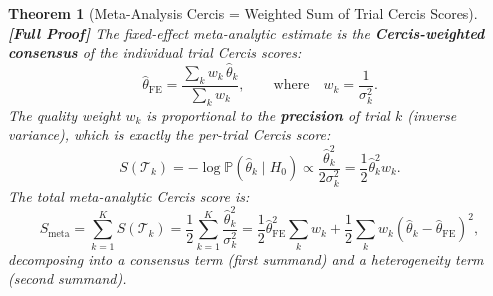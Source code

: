 \documentclass[12pt,a4paper]{article}
\newtheorem{theorem}{Theorem}[section]
\theoremstyle{remark}
\newcommand{\Pbb}{\mathbb{P}}
\newcommand{\rigorFull}{\textbf{[Full Proof]}}
\begin{document}
\begin{theorem}[Meta-Analysis Cercis = Weighted Sum of Trial Cercis Scores]
\label{thm:meta_cercis}
\rigorFull
The fixed-effect meta-analytic estimate is the \textbf{Cercis-weighted
consensus} of the individual trial Cercis scores:
\begin{equation}
  \hat{\theta}_{\text{FE}} = \frac{\sum_k w_k \,\hat{\theta}_k}
  {\sum_k w_k},
  \qquad\text{where}\quad
  w_k = \frac{1}{\sigma_k^2}.
\end{equation}
The quality weight $w_k$ is proportional to the \textbf{precision} of
trial $k$ (inverse variance), which is exactly the per-trial Cercis
score:
\begin{equation}
  S(\mathcal{T}_k) = -\log \Pbb(\hat{\theta}_k \mid H_0) \propto
  \frac{\hat{\theta}_k^2}{2\sigma_k^2} = \frac{1}{2} \hat{\theta}_k^2 w_k.
\end{equation}
The total meta-analytic Cercis score is:
\begin{equation}
  S_{\text{meta}} = \sum_{k=1}^K S(\mathcal{T}_k) =
  \frac{1}{2} \sum_{k=1}^K \frac{\hat{\theta}_k^2}{\sigma_k^2}
  = \frac{1}{2}\hat{\theta}_{\text{FE}}^2 \sum_k w_k
  + \frac{1}{2} \sum_k w_k(\hat{\theta}_k - \hat{\theta}_{\text{FE}})^2,
\end{equation}
decomposing into a consensus term (first summand) and a heterogeneity term
(second summand).
\end{theorem}
\end{document}
